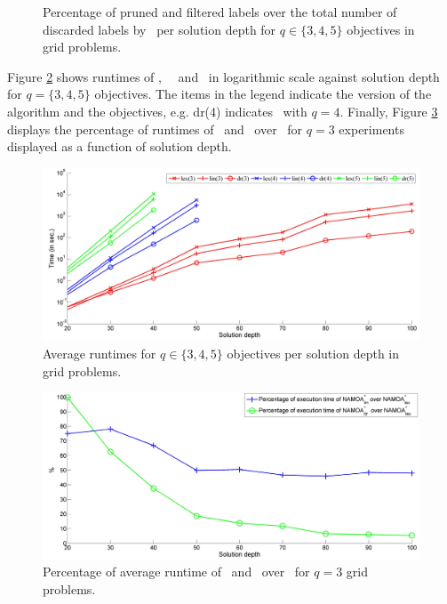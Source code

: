 \begin{figure}
\begin{center}
{      }%
    \end{center}
    \vspace{-0.25in} 
    \caption{%
Percentage of pruned and filtered labels over the total number of discarded labels by \namoate \ per solution depth for $q \in \{3,4,5\}$ objectives in grid problems.  
    }%
    \label{fig:6-9}

\end{figure}

Figure \ref{fig:6-10} shows runtimes of \namoalex, \ \namoalin \ and \namoate \ in logarithmic scale against solution depth for $q=\{3,4,5\}$ objectives. The items in the legend indicate the version of the algorithm and the objectives, e.g. dr(4) indicates \namoate \ with $q=4$. Finally, Figure \ref{fig:6-11} displays the percentage of runtimes of \namoate \ and \namoalin \ over \namoalex \ for $q = 3$ experiments displayed as a function of solution depth. 

\begin{figure}%
\centering
\includegraphics[width=1\textwidth]{Images/Chapter6/exe-time-grids-namoas}
\caption{Average runtimes for $q \in  \{3,4,5\}$ objectives per solution depth in grid problems.}
\label{fig:6-10}
\end{figure}

\begin{figure}%
\centering
\includegraphics[width=1\textwidth]{Images/Chapter6/perc-exe-time-grids-namoas}
\caption{Percentage of average runtime of \namoate \ and \namoalin \ over \namoalex \ for $q = 3$ grid problems.}
\label{fig:6-11}
\end{figure}

